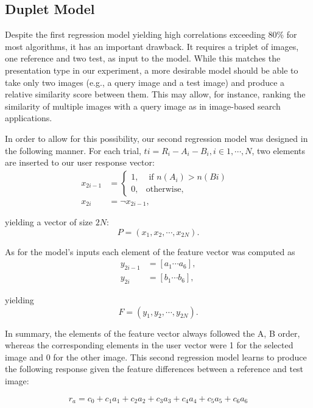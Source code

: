 \subsection{Duplet Model}
Despite the first regression model yielding high correlations exceeding 80\% for most algorithms, it has an important drawback. It requires a triplet of images, one reference and two test, as input to the model. While this matches the presentation type in our experiment, a more desirable model should be able to take only two images (e.g., a query image and a test image) and produce a relative similarity score between them. This may allow, for instance, ranking the similarity of multiple images with a query image as in image-based search applications.

In order to allow for this possibility, our second regression model was designed in the following manner.
For each trial, $ti = R_i - A_i - B_i, i \in {1, \cdots , N}$, two elements are inserted to our user response vector:
\begin{align}
    x_{2i-1} &= \begin{cases} 
    1, &\text{ if $n(A_i) > n(Bi)$ } \\
    0, &\text{otherwise},
    \end{cases}\\
    x_{2i} &= \neg  x_{2i-1},
\end{align}
    

yielding a vector of size $2N$:
\begin{equation}
   P = (x_1, x_2,\cdots, x_{2N} ). 
\end{equation}

As for the model’s inputs each element of the feature vector was computed as
\begin{align}
    y_{2i-1} &= [a_1 \cdots a_6], \\
    y_{2i} &= [b_1 \cdots b_6], 
\end{align}


yielding
\begin{equation}
    F = (y_1, y_2, \cdots , y_{2N} ).
\end{equation}

In summary, the elements of the feature vector always followed the A, B order, whereas the corresponding elements in the user vector were 1 for the selected image and 0 for the other image. This second regression model learns to produce the following response given the feature differences between a reference and test image:

\begin{equation}
\label{eq:log_regression}
    r_a = c_0 + c_1a_1 + c_2a_2 + c_3a_3 + c_4a_4 + c_5a_5 + c_6a_6 
\end{equation}


